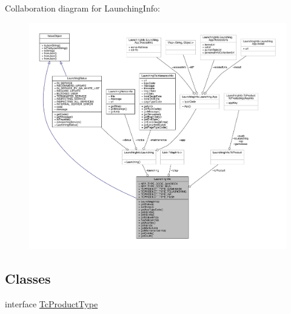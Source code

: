 Collaboration diagram for Launching\+Info\+:
\nopagebreak
\begin{figure}[H]
\begin{center}
\leavevmode
\includegraphics[width=350pt]{classcom_1_1toast_1_1android_1_1gamebase_1_1launching_1_1data_1_1_launching_info__coll__graph}
\end{center}
\end{figure}
\subsection*{Classes}
\begin{DoxyCompactItemize}
\item 
interface \hyperlink{interfacecom_1_1toast_1_1android_1_1gamebase_1_1launching_1_1data_1_1_launching_info_1_1_tc_product_type}{Tc\+Product\+Type}
\end{DoxyCompactItemize}
